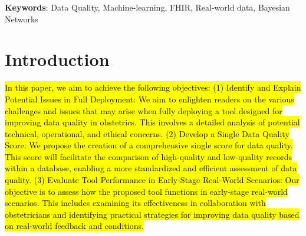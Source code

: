 \documentclass[]{article}
\begin{document}
\textbf{Keywords}: Data Quality, Machine-learning, FHIR, Real-world data, Bayesian Networks


%



%
%
%





%
%
\section{Introduction}



\hl{In this paper, we aim to achieve the following objectives:
(1) Identify and Explain Potential Issues in Full Deployment: We aim to enlighten readers on the various challenges and issues that may arise when fully deploying a tool designed for improving data quality in obstetrics. This involves a detailed analysis of potential technical, operational, and ethical concerns. (2) Develop a Single Data Quality Score: We propose the creation of a comprehensive single score for data quality. This score will facilitate the comparison of high-quality and low-quality records within a database, enabling a more standardized and efficient assessment of data quality. (3) Evaluate Tool Performance in Early-Stage Real-World Scenarios: Our objective is to assess how the proposed tool functions in early-stage real-world scenarios. This includes examining its effectiveness in collaboration with obstetricians and identifying practical strategies for improving data quality based on real-world feedback and conditions.}
\end{document}
